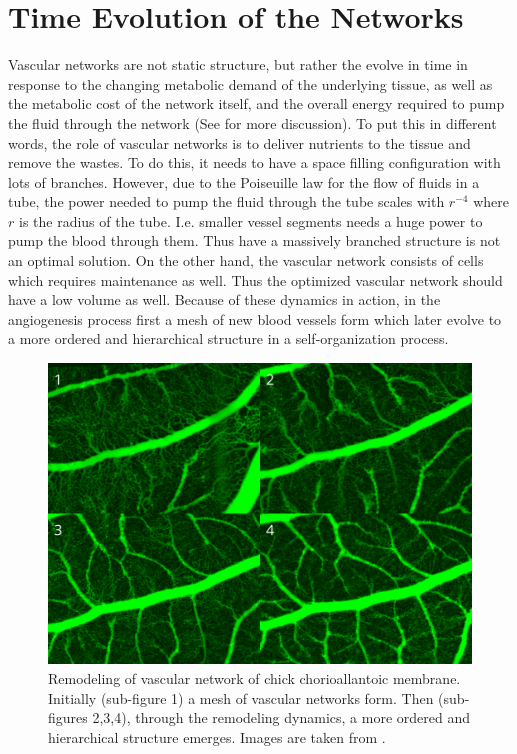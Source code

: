 \documentclass[10pt,a4paper,twocolumn]{article}
\begin{document}
	\section{Time Evolution of the Networks}
	Vascular networks are not static structure, but rather the evolve in time in response to the changing metabolic demand of the underlying tissue, as well as the metabolic cost of the network itself, and the overall energy required to pump the fluid through the network (See  \cite{Pries2010,Secomb2012,Pries2014,Ouarne2021} for more discussion). To put this in different words, the role of vascular networks is to deliver nutrients to the tissue and remove the wastes. To do this, it needs to have a space filling configuration with lots of branches. However, due to the Poiseuille law for the flow of fluids in a tube, the power needed to pump the fluid through the tube scales with $ r^{-4} $ where $ r $ is the radius of the tube. I.e. smaller vessel segments needs a huge power to pump the blood through them. Thus have a massively branched structure is not an optimal solution. On the other hand, the vascular network consists of cells which requires maintenance as well. Thus the optimized vascular network should have a low volume as well. Because of these dynamics in action, in the angiogenesis process first a mesh of new blood vessels form which later evolve to a more ordered and hierarchical structure in a self-organization process.
	
	
	\begin{figure}
		\centering
		\includegraphics[width=\linewidth]{images/remodeling2}
		\caption{Remodeling of vascular network of chick chorioallantoic membrane. Initially (sub-figure 1) a mesh of vascular networks form. Then (sub-figures 2,3,4), through the remodeling dynamics, a more ordered and hierarchical structure emerges. Images are taken from \cite{Richard2018}.}
		\label{fig:remodeling1}
	\end{figure}
	
\end{document}
